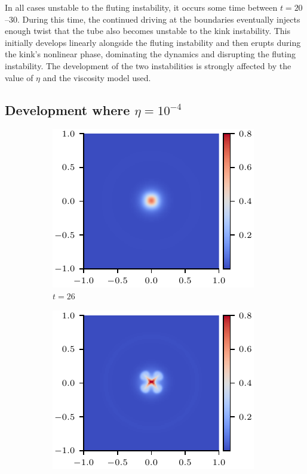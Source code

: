 In all cases unstable to the fluting instability, it occurs some time between $t=20$--$30$. During this time, the continued driving at the boundaries eventually injects enough twist that the tube also becomes unstable to the kink instability. This initially develops linearly alongside the fluting instability and then erupts during the kink's nonlinear phase, dominating the dynamics and disrupting the fluting instability. The development of the two instabilities is strongly affected by the value of $\eta$ and the viscosity model used.

\subsection{Development where $\eta=10^{-4}$}

\begin{figure}[t]
  \centering
    \begin{subfigure}{0.32\textwidth}
      \includegraphics[width=\linewidth]{swi-4_pressure_13.pdf}
      \caption{$t=26$}
      \label{fig:swi-4_pressure_13}
    \end{subfigure}
    \hfill
    \begin{subfigure}{0.32\textwidth}
      \includegraphics[width=\linewidth]{swi-4_pressure_14.pdf}

\end{subfigure}
\end{figure}
